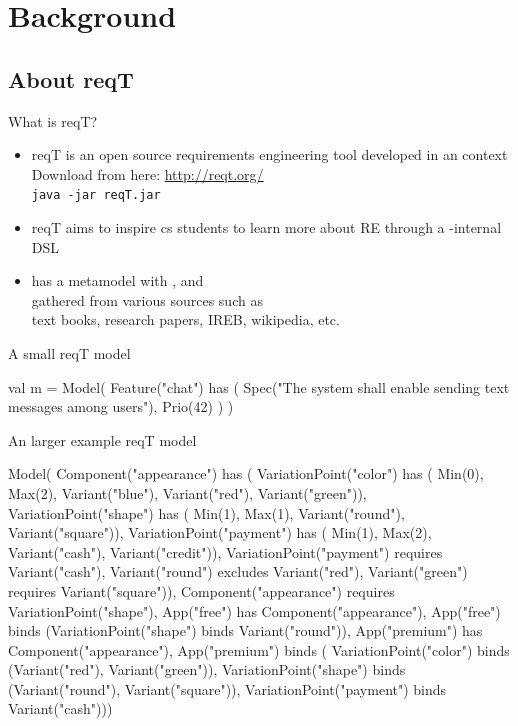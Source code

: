 \documentclass{slides}
\begin{document}
\section{Background}
\subsection{About reqT}
\begin{Slide}{What is reqT?}
\begin{itemize}
\item reqT is an open source requirements engineering tool developed in an  context\\ Download from here: \url{http://reqt.org/} \\ \texttt{java -jar reqT.jar}
\item reqT aims to inspire  cs students to learn more about RE through a -internal DSL
\item has a metamodel with {\color{entityColor}{\bf entities}}, {\color{relationColor}{\bf relations}} and {\color{attributeColor}{\bf attributes}}\\ gathered from various sources such as \\ text books, research papers, IREB, wikipedia, etc.
\end{itemize}
\end{Slide}

\begin{Slide}{A small reqT model}
\begin{Code}
val m = Model(
  Feature("chat") has (
    Spec("The system shall enable sending text messages among users"),
    Prio(42)
  )
)
\end{Code}
\end{Slide}

\begin{Slide}{An larger example reqT model}
\begin{Code}
Model(
  Component("appearance") has (
    VariationPoint("color") has (
      Min(0), Max(2), Variant("blue"), Variant("red"), Variant("green")),
    VariationPoint("shape") has (
      Min(1), Max(1), Variant("round"), Variant("square")),
    VariationPoint("payment") has (
      Min(1), Max(2), Variant("cash"), Variant("credit")),
    VariationPoint("payment") requires Variant("cash"), 
    Variant("round") excludes Variant("red"),
    Variant("green") requires Variant("square")),
  Component("appearance") requires VariationPoint("shape"), 
  App("free") has Component("appearance"),  
  App("free") binds (VariationPoint("shape") binds Variant("round")),
  App("premium") has Component("appearance"),  
  App("premium") binds ( 
    VariationPoint("color") binds (Variant("red"), Variant("green")),
    VariationPoint("shape") binds (Variant("round"), Variant("square")),
    VariationPoint("payment") binds Variant("cash")))
\end{Code}
\end{Slide}
\end{document}
